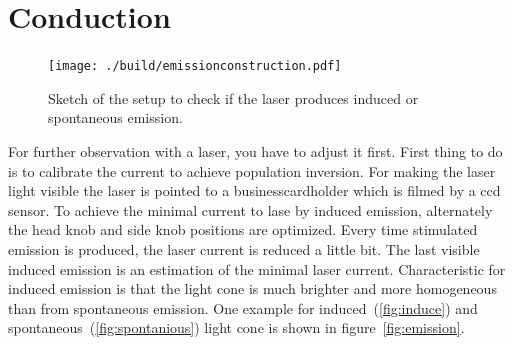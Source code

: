 \section{Conduction}%
\label{sec:conduction}
\begin{figure}
		\centering
		\texttt{[image: ./build/emissionconstruction.pdf]}
		\caption{Sketch of the setup to check if the laser produces induced or
		spontaneous emission. \cite{anleitung}}
		\label{fig:aufbau}
\end{figure}
For further observation with a laser, you have to adjust it first. 
First thing to do is to calibrate the current to achieve population inversion. 
For making the laser light visible the laser is pointed to a businesscardholder
which is filmed by a ccd sensor.
To achieve the minimal current to lase by induced emission, alternately the head
knob and side knob positions are optimized.
Every time stimulated emission is produced, the laser current is reduced a
little bit. 
The last visible induced emission is an estimation of the minimal laser current.
Characteristic for induced emission is that the light cone is
much brighter and more homogeneous than from spontaneous emission.
One example for induced~(\ref{fig:induce}) and spontaneous~(\ref{fig:spontanious}) light cone is
shown in figure~\ref{fig:emission}.

